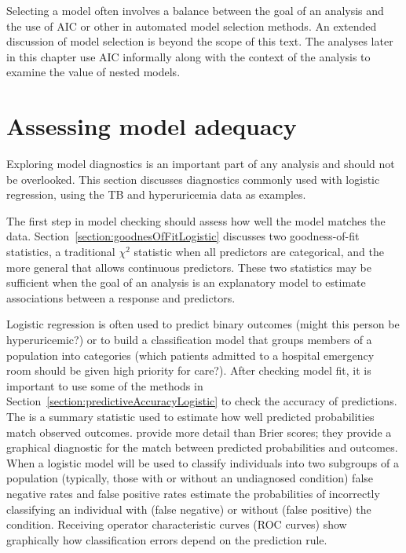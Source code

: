 Selecting a model often involves a balance between the goal of an analysis and the use of AIC or other in automated model selection methods. An extended discussion of model selection is beyond the scope of this text. The analyses later in this chapter use AIC informally along with the context of the analysis to examine the value of nested models.  

\section{Assessing model adequacy}
\label{assessingModelFitMultipleLogisticRegression}

Exploring model diagnostics is an important part of any analysis and should not be overlooked.  This section discusses diagnostics commonly used with logistic regression, using the TB and hyperuricemia data as examples.

The first step in model checking should assess how well the model matches the data.  Section~\ref{section:goodnesOfFitLogistic} discusses two goodness-of-fit statistics, a traditional $\chi^2$ statistic when all predictors are categorical, and the more general  that allows continuous predictors.  These two statistics may be sufficient when the goal of an analysis is an explanatory model to estimate associations between a response and predictors.

Logistic regression is often used to predict binary outcomes (might this person be hyperuricemic?) or to build a classification model that groups members of a population into categories (which patients admitted to a hospital emergency room should be given high priority for care?).  After checking model fit, it is important to use some of the methods in Section~\ref{section:predictiveAccuracyLogistic} to check the accuracy of predictions.  The  is a summary statistic used to estimate how well predicted probabilities match observed outcomes.   provide more detail than Brier scores; they provide a graphical diagnostic for the match between predicted probabilities and outcomes.  When a logistic model will be used to classify individuals into two subgroups of a population (typically, those with or without an undiagnosed condition) false negative rates  and false positive rates    estimate the probabilities of incorrectly classifying an individual with (false negative) or without (false positive) the condition.  Receiving operator characteristic curves  (ROC curves) show graphically how classification errors depend on the prediction rule.

